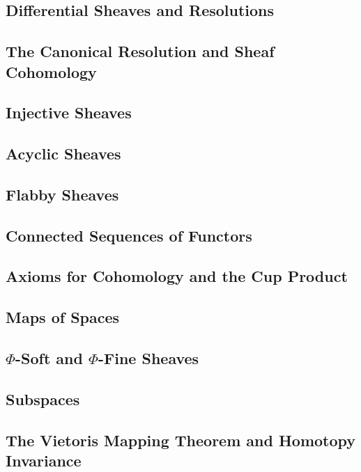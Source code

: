 \documentclass[11pt, a4paper]{article}
\begin{document}
\subsection{Differential Sheaves and Resolutions}

\subsection{The Canonical Resolution and Sheaf Cohomology}

\subsection{Injective Sheaves}

\subsection{Acyclic Sheaves}

\subsection{Flabby Sheaves}

\subsection{Connected Sequences of Functors}

\subsection{Axioms for Cohomology and the Cup Product}

\subsection{Maps of Spaces}

\subsection{$\Phi$-Soft and $\Phi$-Fine Sheaves}

\subsection{Subspaces}

\subsection{The Vietoris Mapping Theorem and Homotopy Invariance}
\end{document}
